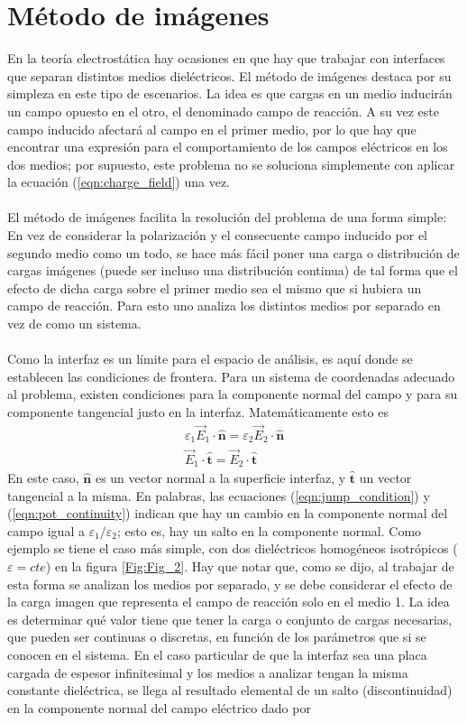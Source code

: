 \documentclass[12pt, twoside, onehalfspace, numbers, spanish]{ezthesis}
\numberwithin{equation}{section}
\begin{document}
\section{Método de imágenes}\label{Sec:Image_Method}
En la teoría electrostática hay ocasiones en que hay que trabajar con interfaces que separan distintos medios dieléctricos. El método de imágenes destaca por su simpleza en este tipo de escenarios. La idea es que cargas en un medio inducirán un campo opuesto en el otro, el denominado campo de reacción. A su vez este campo inducido afectará al campo en el primer medio, por lo que hay que encontrar una expresión para el comportamiento de los campos eléctricos en los dos medios; por supuesto, este problema no se soluciona simplemente con aplicar la ecuación (\ref{eqn:charge_field}) una vez.\\\\
El método de imágenes facilita la resolución del problema de una forma simple: En vez de considerar la polarización y el consecuente campo inducido por el segundo medio como un todo, se hace más fácil poner una carga o distribución de cargas imágenes (puede ser incluso una distribución continua) de tal forma que el efecto de dicha carga sobre el primer medio sea el mismo que si hubiera un campo de reacción. Para esto uno analiza los distintos medios por separado en vez de como un sistema.\\\\
Como la interfaz es un límite para el espacio de análisis, es aquí donde se establecen las condiciones de frontera. Para un sistema de coordenadas adecuado al problema, existen condiciones para la componente normal del campo y para su componente tangencial justo en la interfaz. Matemáticamente esto es
\begin{gather}
\varepsilon_1\vec{E}_1\cdot\hat{\mathbf{n}} = \varepsilon_2\vec{E}_2\cdot\hat{\mathbf{n}} \label{eqn:jump_condition}\\
\vec{E}_1\cdot\hat{\mathbf{t}} = \vec{E}_2\cdot\hat{\mathbf{t}} \label{eqn:pot_continuity}
\end{gather}
En este caso, $\hat{\mathbf{n}}$ es un vector normal a la superficie interfaz, y $\hat{\mathbf{t}}$ un vector tangencial a la misma. En palabras, las ecuaciones (\ref{eqn:jump_condition}) y (\ref{eqn:pot_continuity}) indican que hay un cambio en la componente normal del campo igual a $\varepsilon_1/\varepsilon_2$; esto es, hay un salto en la componente normal. Como ejemplo se tiene el caso más simple, con dos dieléctricos homogéneos isotrópicos ($\varepsilon = cte$) en la figura \ref{Fig:Fig_2}. Hay que notar que, como se dijo, al trabajar de esta forma se analizan los medios por separado, y se debe considerar el efecto de la carga imagen que representa el campo de reacción solo en el medio 1. La idea es determinar qué valor tiene que tener la carga o conjunto de cargas necesarias, que pueden ser continuas o discretas, en función de los parámetros que si se conocen en el sistema. En el caso particular de que la interfaz sea una placa cargada de espesor infinitesimal y los medios a analizar tengan la misma constante dieléctrica, se llega al resultado elemental de un salto (discontinuidad) en la componente normal del campo eléctrico dado por
\end{document}
